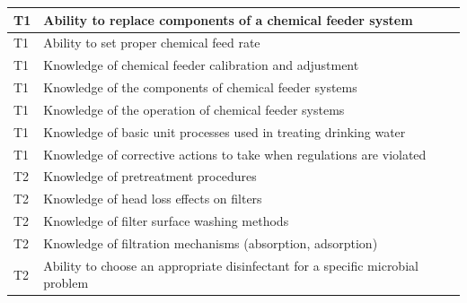 \begin{table}[H]
\begin{tabular}{| m{1cm} | m{15cm} |}
T1 & Ability to replace   components of a chemical feeder system                                \\ \hline
T1 & Ability to set proper   chemical feed rate                                                 \\ \hline
T1 & Knowledge of chemical   feeder calibration and adjustment                                  \\ \hline
T1 & Knowledge of the   components of chemical feeder systems                                   \\ \hline
T1 & Knowledge of the   operation of chemical feeder systems                                    \\ \hline
T1 & Knowledge of basic   unit processes used in treating drinking water                        \\ \hline
T1 & Knowledge of   corrective actions to take when regulations are violated                    \\ \hline
T2 & Knowledge of   pretreatment procedures                                                     \\ \hline
T2 & Knowledge of head   loss effects on filters                                                \\ \hline
T2 & Knowledge of filter   surface washing methods                                              \\ \hline
T2 & Knowledge of   filtration mechanisms (absorption, adsorption)                              \\ \hline
T2 & Ability to choose an   appropriate disinfectant for a specific microbial problem           \\ \hline
\end{tabular}
\end{table}


\newpage



